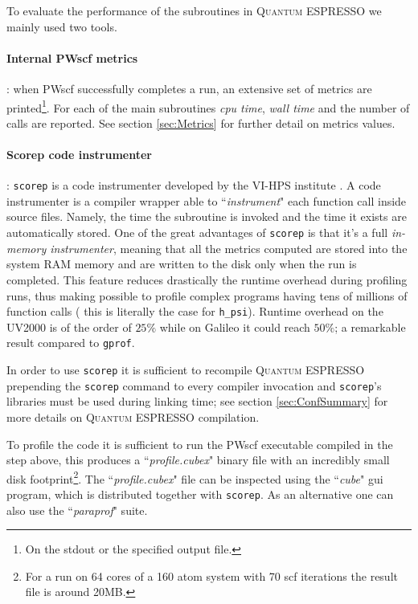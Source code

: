 \documentclass[a4paper,12pt]{article}
\newcommand\QE{\textsc{Quantum} ESPRESSO }
\begin{document}
To evaluate the performance of the subroutines in \QE we mainly used two tools.

\paragraph{Internal PWscf metrics}: when PWscf successfully completes a run, an extensive set of metrics are printed\footnote{On the stdout or the specified output file.}. 
For each of the main subroutines  \textit{cpu time}, \textit{wall time} and the number of calls are reported.
See section \ref{sec:Metrics} for further detail on metrics values.

\paragraph{Scorep code instrumenter}: \texttt{scorep}\cite{SCOREPManual} is a code instrumenter developed by the VI-HPS institute \cite{VH}. 
A code instrumenter is a compiler wrapper able to ``\textit{instrument}" each function call inside source files.
Namely, the time the subroutine is invoked and the time it exists are automatically stored.
One of the great advantages of \texttt{scorep} is that it's a full \textit{in-memory instrumenter}, meaning that all the metrics computed are stored into the system RAM memory and are written to the disk only when the run is completed.
This feature reduces drastically the runtime overhead during profiling runs, thus making possible to profile complex programs having tens of millions of function calls ( this is literally the case for \texttt{h\_psi}).
Runtime overhead on the UV2000 is of the order of $25\%$ while on Galileo it could reach $50\%$; a remarkable result compared to \texttt{gprof}.

In order to use \texttt{scorep} it is sufficient to recompile \QE prepending the \texttt{scorep} command to every compiler invocation and  \texttt{scorep}'s libraries must be used during linking time; see section \ref{sec:ConfSummary} for more details on \QE compilation.

To profile the code it is sufficient to run the PWscf executable compiled in the step above, this produces a ``\textit{profile.cubex}" binary file with an incredibly small disk footprint\footnote{For a run on 64 cores of a 160 atom system with 70 scf iterations the result file is around 20MB.}.
The ``\textit{profile.cubex}" file can be inspected using the ``\textit{cube}" gui program, which is distributed together with \texttt{scorep}. As an alternative one can also use the ``\textit{paraprof}" suite.
\end{document}
